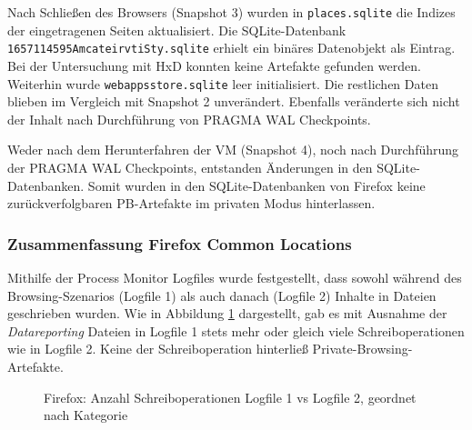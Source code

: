 \begin{appendices}
Nach Schließen des Browsers (Snapshot 3) wurden in \texttt{places.sqlite} die Indizes der eingetragenen Seiten aktualisiert. Die SQLite-Datenbank \texttt{1657114595AmcateirvtiSty.sqlite} erhielt ein binäres Datenobjekt als Eintrag. Bei der Untersuchung mit HxD konnten keine Artefakte gefunden werden. Weiterhin wurde \texttt{webappsstore.sqlite} leer initialisiert. Die restlichen Daten blieben im Vergleich mit Snapshot 2 unverändert. Ebenfalls veränderte sich nicht der Inhalt nach Durchführung von PRAGMA WAL Checkpoints.

Weder nach dem Herunterfahren der VM (Snapshot 4), noch nach Durchführung der PRAGMA WAL Checkpoints, entstanden Änderungen in den SQLite-Datenbanken.	
Somit wurden in den SQLite-Datenbanken von Firefox keine zurückverfolgbaren PB-Artefakte im privaten Modus hinterlassen.

\subsubsection*{Zusammenfassung Firefox Common Locations}
Mithilfe der Process Monitor Logfiles wurde festgestellt, dass sowohl während des Browsing-Szenarios (Logfile 1) als auch danach (Logfile 2) Inhalte in Dateien geschrieben wurden. Wie in Abbildung \ref{chart:firefox-writefile-logfile1v2} dargestellt, gab es mit Ausnahme der \textit{Datareporting} Dateien in Logfile 1 stets mehr oder gleich viele Schreiboperationen wie in Logfile 2. Keine der Schreiboperation hinterließ Private-Browsing-Artefakte.

\begin{figure}[h!]
	\caption{Firefox: Anzahl Schreiboperationen Logfile 1 vs Logfile 2, geordnet nach Kategorie}
	\label{chart:firefox-writefile-logfile1v2}
\end{figure}


\end{appendices}
